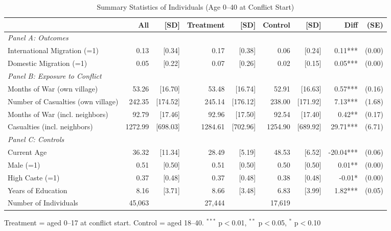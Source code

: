 \begin{table}[htbp]
\centering
\footnotesize
\caption{Summary Statistics of Individuals (Age 0--40 at Conflict Start)}
\label{tab:summary_stats}
\begin{tabular}{lrrrrrrrr}
\toprule
 & All & [SD] & Treatment & [SD] & Control & [SD] & Diff & (SE) \\
\midrule
\textit{Panel A: Outcomes} & & & & & & & & \\
\quad International Migration (=1) & 0.13 & [0.34] & 0.17 & [0.38] & 0.06 & [0.24] & 0.11*** & (0.00) \\
\quad Domestic Migration (=1) & 0.05 & [0.22] & 0.07 & [0.26] & 0.02 & [0.15] & 0.05*** & (0.00) \\
\textit{Panel B: Exposure to Conflict} & & & & & & & & \\
\quad Months of War (own village) & 53.26 & [16.70] & 53.48 & [16.74] & 52.91 & [16.63] & 0.57*** & (0.16) \\
\quad Number of Casualties (own village) & 242.35 & [174.52] & 245.14 & [176.12] & 238.00 & [171.92] & 7.13*** & (1.68) \\
\quad Months of War (incl. neighbors) & 92.79 & [17.46] & 92.96 & [17.50] & 92.54 & [17.40] & 0.42** & (0.17) \\
\quad Casualties (incl. neighbors) & 1272.99 & [698.03] & 1284.61 & [702.96] & 1254.90 & [689.92] & 29.71*** & (6.71) \\
\textit{Panel C: Controls} & & & & & & & & \\
\quad Current Age & 36.32 & [11.34] & 28.49 & [5.19] & 48.53 & [6.52] & -20.04*** & (0.06) \\
\quad Male (=1) & 0.51 & [0.50] & 0.51 & [0.50] & 0.50 & [0.50] & 0.01** & (0.00) \\
\quad High Caste (=1) & 0.37 & [0.48] & 0.37 & [0.48] & 0.38 & [0.48] & -0.01* & (0.00) \\
\quad Years of Education & 8.16 & [3.71] & 8.66 & [3.48] & 6.83 & [3.99] & 1.82*** & (0.05) \\
\quad Number of Individuals & 45,063 &  & 27,444 &  & 17,619 &  &  &  \\
\bottomrule
\end{tabular}
\begin{tablenotes}
\footnotesize
\item Treatment = aged 0--17 at conflict start. Control = aged 18--40. $^{***}$ p$<$0.01, $^{**}$ p$<$0.05, $^{*}$ p$<$0.10
\end{tablenotes}
\end{table}

